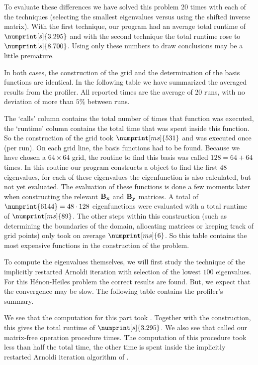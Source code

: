 To evaluate these differences we have solved this problem 20 times with each of the techniques (selecting the smallest eigenvalues versus using the shifted inverse matrix). With the first technique, our program had an average total runtime of $\numprint[s]{3.295}$ and with the second technique the total runtime rose to $\numprint[s]{8.700}$. Using only these numbers to draw conclusions may be a little premature.

In both cases, the construction of the grid and the determination of the basis functions are identical. In the following table we have summarized the averaged results from the profiler. All reported times are the average of 20 runs, with no deviation of more than $5\%$ between runs.

\begin{center}
    
\end{center}

The `calls' column contains the total number of times that function was executed, the `runtime' column contains the total time that was spent inside this function. So the construction of the grid took $\numprint[ms]{531}$ and was executed once (per run). On each grid line, the basis functions had to be found. Because we have chosen a $64 \times 64$ grid, the routine to find this basis was called $128 = 64 + 64$ times. In this routine our program constructs a \matslise{} object to find the first $48$ eigenvalues, for each of these eigenvalues the eigenfunction is also calculated, but not yet evaluated. The evaluation of these functions is done a few moments later when constructing the relevant $\vb{B_x}$ and $\vb{B_y}$ matrices. A total of $\numprint{6144} = 48 \cdot 128$ eigenfunctions were evaluated with a total runtime of $\numprint[ms]{89}$. The other steps within this construction (such as determining the boundaries of the domain, allocating matrices or keeping track of grid points) only took on average $\numprint[ms]{6}$. So this table contains the most expensive functions in the construction of the problem.

To compute the eigenvalues themselves, we will first study the technique of the implicitly restarted Arnoldi iteration with selection of the lowest $100$ eigenvalues. For this Hénon-Heiles problem the correct results are found. But, we expect that the convergence may be slow. The following table contains the profiler's summary.
\begin{center}
    
\end{center}
We see that the computation for this part took . Together with the construction, this gives the total runtime of $\numprint[s]{3.295}$. We also see that \spectra{} called our matrix-free operation procedure  times. The computation of this procedure took less than half the total time, the other time is spent inside the implicitly restarted Arnoldi iteration algorithm of \spectra{}.

